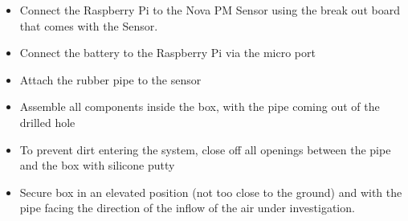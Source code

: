 \documentclass[
  authoryear,
  review,
  3p]{elsarticle}
\providecommand{\tightlist}{%
  \setlength{\itemsep}{0pt}\setlength{\parskip}{0pt}}\usepackage{longtable,booktabs,array}
\begin{document}
\begin{itemize}
\tightlist
\item
  Connect the Raspberry Pi to the Nova PM Sensor using the break out
  board that comes with the Sensor.
\item
  Connect the battery to the Raspberry Pi via the micro port
\item
  Attach the rubber pipe to the sensor
\item
  Assemble all components inside the box, with the pipe coming out of
  the drilled hole
\item
  To prevent dirt entering the system, close off all openings between
  the pipe and the box with silicone putty
\item
  Secure box in an elevated position (not too close to the ground) and
  with the pipe facing the direction of the inflow of the air under
  investigation.
\end{itemize}


\renewcommand\refname{References}
  
\end{document}
